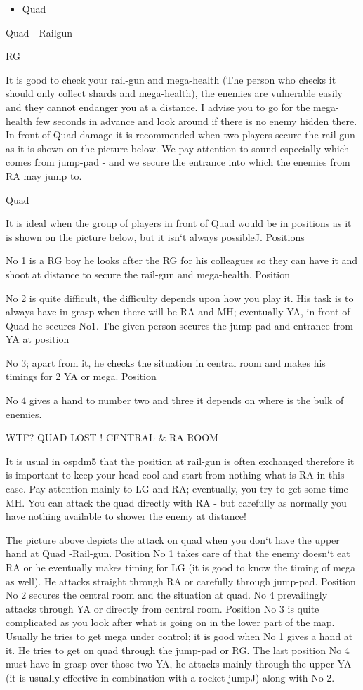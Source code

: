 \documentclass[11pt]{article}
\begin{document}
\begin{itemize}
\item Quad
\end{itemize}


Quad - Railgun
 
RG

It is good to check your rail-gun and mega-health (The person who checks it
should only collect shards and mega-health), the enemies are vulnerable easily
and they cannot endanger you at a distance. I advise you to go for the mega-
health few seconds in advance and look around if there is no enemy hidden
there. In front of Quad-damage it is recommended when two players secure the
rail-gun as it is shown on the picture below. We pay attention to
sound especially which comes from jump-pad  - and we secure
the entrance into which the enemies from RA may jump to.

Quad
 
It is ideal when the group of players in front of Quad would be in positions as
it is shown on the picture below, but it isn`t always possibleJ.
Positions

No 1 is a RG boy he looks after the RG for his colleagues so they can have
it and shoot at distance to secure the rail-gun and mega-health. Position
 
No 2 is quite difficult, the difficulty depends upon how you play it. His task
is to always have in grasp when there will be RA and MH; eventually YA,  in
front of Quad he secures No1. The given person secures the jump-pad and
entrance from YA at position
 
No 3; apart from it, he checks the situation in central room and makes his
timings for 2 YA or mega. Position
 
No 4 gives a hand to number two and three it depends on where is the bulk
of enemies.

 
WTF? QUAD LOST ! CENTRAL \& RA ROOM

It is usual in ospdm5 that the position at rail-gun is often exchanged
therefore it is important to keep your head cool and start from
nothing what is RA in this case. Pay attention mainly to LG and RA; eventually, you try
to get some time MH. You can attack the quad directly with RA  - but
carefully as normally you have nothing available to shower the enemy at distance!
 


The picture above depicts the attack on quad when you don`t have the upper hand
at Quad -Rail-gun. Position No 1 takes care of that the enemy doesn`t  eat RA
or he eventually makes timing for LG (it is good to know the timing of mega as
well). He attacks straight through RA or carefully through jump-pad.  Position
No 2 secures the central room and the situation at quad. No 4 prevailingly
attacks through YA or directly from central room. Position No 3 is quite
complicated as you look after what is going on in the lower part of the
map. Usually he tries to get mega under control; it is good when No 1 gives a
hand at it. He tries to get on quad through the jump-pad or RG. The last
position No 4 must have in grasp over
those two YA, he attacks mainly through the upper YA
(it is usually effective in combination with a rocket-jumpJ) along with No 2.
\end{document}
